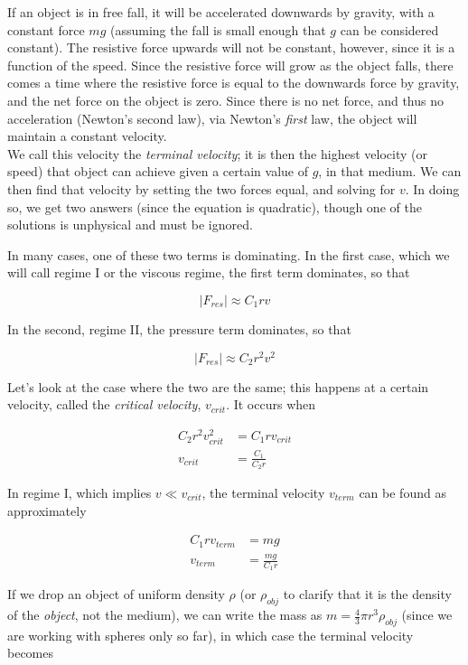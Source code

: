 If an object is in free fall, it will be accelerated downwards by gravity, with a constant force $m g$ (assuming the fall is small enough that $g$ can be considered constant). The resistive force upwards will not be constant, however, since it is a function of the speed. Since the resistive force will grow as the object falls, there comes a time where the resistive force is equal to the downwards force by gravity, and the net force on the object is zero. Since there is no net force, and thus no acceleration (Newton's second law), via Newton's \emph{first} law, the object will maintain a constant velocity.\\
We call this velocity the \emph{terminal velocity}; it is then the highest velocity (or speed) that object can achieve given a certain value of $g$, in that medium. We can then find that velocity by setting the two forces equal, and solving for $v$. In doing so, we get two answers (since the equation is quadratic), though one of the solutions is unphysical and must be ignored.

In many cases, one of these two terms is dominating. In the first case, which we will call regime I or the viscous regime, the first term dominates, so that

\begin{equation}
|F_{res}| \approx C_1 r v
\end{equation}

In the second, regime II, the pressure term dominates, so that

\begin{equation}
|F_{res}| \approx C_2 r^2 v^2
\end{equation}

Let's look at the case where the two are the same; this happens at a certain velocity, called the \emph{critical velocity}, $v_{crit}$. It occurs when

\begin{align}
C_2 r^2 v_{crit}^2 &= C_1 r v_{crit}\\
v_{crit} &= \frac{C_1}{C_2 r}
\end{align}

In regime I, which implies $v \ll v_{crit}$, the terminal velocity $v_{term}$ can be found as approximately

\begin{align}
C_1 r v_{term} &= m g\\
v_{term} &= \frac{m g}{C_1 r}
\end{align}

If we drop an object of uniform density $\rho$ (or $\rho_{obj}$ to clarify that it is the density of the \emph{object}, not the medium), we can write the mass as $m = \frac{4}{3} \pi r^3 \rho_{obj}$ (since we are working with spheres only so far), in which case the terminal velocity becomes

